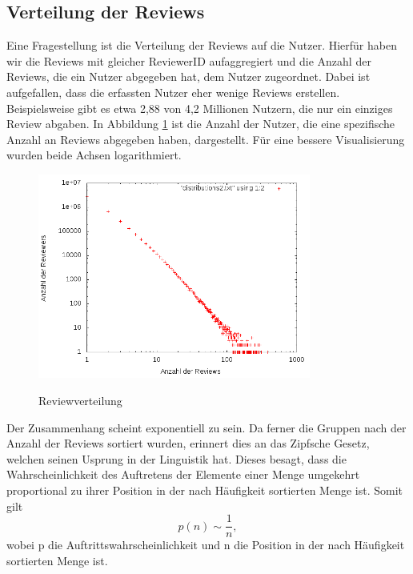 \documentclass{scrartcl}
\theoremstyle{my_th_style}
\begin{document}
\subsection{Verteilung der Reviews}
Eine Fragestellung ist die Verteilung der Reviews auf die Nutzer. Hierfür haben wir die Reviews mit gleicher ReviewerID aufaggregiert und die Anzahl der Reviews, die ein Nutzer abgegeben hat, dem Nutzer zugeordnet. Dabei ist aufgefallen, dass die erfassten Nutzer eher wenige Reviews erstellen. Beispielsweise gibt es etwa 2,88 von 4,2 Millionen Nutzern, die nur ein einziges Review abgaben. In Abbildung \ref{fig_reviews} ist die Anzahl der Nutzer, die eine spezifische Anzahl an Reviews abgegeben haben, dargestellt. Für eine bessere Visualisierung wurden beide Achsen logarithmiert. 
\begin{figure}
    \centering
    \includegraphics[width=0.8\textwidth]{bild.png}
    \label{fig_reviews}
    \caption{Reviewverteilung}
\end{figure}
Der Zusammenhang scheint exponentiell zu sein. Da ferner die Gruppen nach der Anzahl der Reviews sortiert wurden, erinnert dies an das Zipfsche Gesetz, welchen seinen Usprung in der Linguistik hat. Dieses besagt, dass die Wahrscheinlichkeit des Auftretens der Elemente einer Menge umgekehrt proportional zu ihrer Position in der nach Häufigkeit sortierten Menge ist. Somit gilt 
\begin{equation}
	p(n)\sim \frac{1}{n},
\end{equation}
wobei p die Auftrittswahrscheinlichkeit und n die Position in der nach Häufigkeit sortierten Menge ist.
\end{document}
